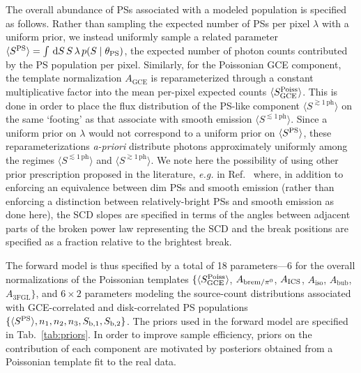 \documentclass[prd,aps,10pt,nofootinbib,twocolumn,superscriptaddress,preprintnumbers,balancelastpage,longbibliography]{revtex4-1}
\begin{document}
The overall abundance of PSs associated with a modeled population is specified as follows. Rather than sampling the expected number of PSs per pixel $\lambda$ with a uniform prior, we instead uniformly sample a related parameter $\langle S^{\rm PS} \rangle = \int\,\mathrm{d} S\,S\,\lambda \, p(S\mid\theta_\mathrm{PS})$, the expected number of photon counts contributed by the PS population per pixel. Similarly, for the Poissonian GCE component, the template normalization $A_\mathrm{GCE}$ is reparameterized through a constant multiplicative factor into the mean per-pixel expected counts $\langle S^{\rm Poiss}_\mathrm{GCE} \rangle$. This is done in order to place the flux distribution of the PS-like component $\langle S^{\gtrsim 1\,\mathrm{ph}} \rangle$ on the same `footing' as that associate with smooth emission $\langle S^{\lesssim 1\,\mathrm{ph}} \rangle$. Since a uniform prior on $\lambda$ would not correspond to a uniform prior on $\langle S^{\rm PS} \rangle$, these reparameterizations \emph{a-priori} distribute photons approximately uniformly among the regimes $\langle S^{\lesssim 1\,\mathrm{ph}} \rangle$ and $\langle S^{\gtrsim 1\,\mathrm{ph}} \rangle$. We note here the possibility of using other prior prescription proposed in the literature, \emph{e.g.} in Ref.~\cite{Collin:2021ufc} where, in addition to enforcing an equivalence between dim PSs and smooth emission (rather than enforcing a distinction between relatively-bright PSs and smooth emission as done here), the SCD slopes are specified in terms of the angles between adjacent parts of the broken power law representing the SCD and the break positions are specified as a fraction relative to the brightest break.

The forward model is thus specified by a total of 18 parameters---6 for the overall normalizations of the Poissonian templates $\{\langle S_{\rm GCE}^{\rm Poiss} \rangle$, $A_{{\rm brem}/\pi^0}$, $A_{\rm ICS}$, $A_\text{iso}$, $A_\text{bub}$, $A_\text{3FGL}\}$, and $6\times2$ parameters modeling the source-count distributions associated with GCE-correlated and disk-correlated PS populations $\{\langle S^{\rm PS} \rangle, n_1, n_2, n_3, S_{\mathrm b, 1}, S_{\mathrm b, 2}\}$. The priors used in the forward model are specified in Tab.~\ref{tab:priors}. In order to improve sample efficiency, priors on the contribution of each component are motivated by posteriors obtained from a Poissonian template fit to the real \Fermi data. 
\end{document}
